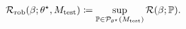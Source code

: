 \begin{align}\label{eqn:robust-risk}
    \mathcal{R}_{\mathrm{rob}}(\beta;\theta^{\star}, M_{\mathrm{test}}) \coloneqq \sup_{\mathbb{P} \in \mathcal{P}_{\theta^{\star}}(M_{\mathrm{test}})} \mathcal{R}( \beta; \mathbb{P}). 
\end{align}

